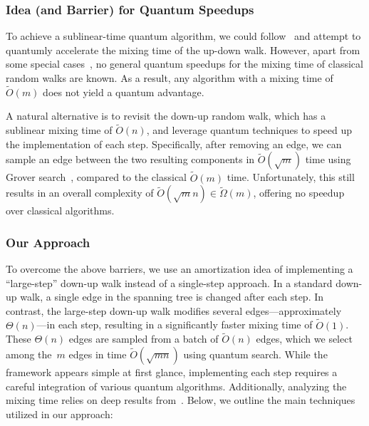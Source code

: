 \documentclass[11pt]{article}
\begin{document}
{\subsubsection{Idea (and Barrier) for Quantum Speedups}

To achieve a sublinear-time quantum algorithm, we could
follow~\cite{anari2021log} and attempt to quantumly accelerate the mixing time
of the up-down walk.
However, apart from some special
cases~\cite{aharonov2001quantum,moore2002quantum,richter2007quantum}, no general
quantum speedups for the mixing time of classical random walks are known.
As a result, any algorithm with a mixing time of $\widetilde{O}(m)$ does not
yield a quantum advantage.

A natural alternative is to revisit the down-up random walk, which has a
sublinear mixing time of $\widetilde{O}(n)$, and leverage quantum techniques to
speed up the implementation of each step.
Specifically, after removing an edge, we can sample an edge between the two
resulting components in $\widetilde{O}(\sqrt{m})$ time using Grover
search~\cite{grover1996fast}, compared to the classical $\widetilde{O}(m)$ time.
Unfortunately, this still results in an overall complexity of
$\widetilde{O}(\sqrt{m} n) \in \widetilde{\Omega}(m)$, offering no speedup over
classical algorithms.

\subsubsection{Our Approach}
To overcome the above barriers, we use an amortization idea of implementing a
``large-step'' down-up walk instead of a single-step approach.
In a standard down-up walk, a single edge in the spanning tree is changed after
each step.
In contrast, the large-step down-up walk modifies several edges---approximately
$\Theta(n)$---in each step, resulting in a significantly faster mixing time of
$\widetilde{O}(1)$.
These $\Theta(n)$ edges are sampled from a batch of $\widetilde O(n)$ edges,
which we select among the~$m$ edges in time $\widetilde O(\sqrt{m n})$ using
quantum search.
While the framework appears simple at first glance, implementing each step
requires a careful integration of various quantum algorithms.
Additionally, analyzing the mixing time relies on deep results
from~\cite{ALV22}.
Below, we outline the main techniques utilized in our approach:

}
\end{document}
